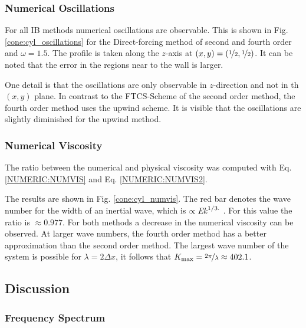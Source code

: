 \subsubsection{Numerical Oscillations}

For all IB methods numerical oscillations are observable.
This is shown in Fig. \ref{cone:cyl_oscillations} for the Direct-forcing method of second and fourth order and $\omega=1.5$.
The profile is taken along the $z$-axis at $(x,y)=(\nicefrac{1}{2},\nicefrac{1}{2})$.
It can be noted that the error  in the regions near to the wall is larger.

One detail is that the oscillations are only observable in $z$-direction and not
in th $(x,y)$ plane.
In contrast to the FTCS-Scheme of the second order method, the fourth order method uses the upwind scheme.
It is visible that the oscillations are slightly diminished for the upwind method.

\subsubsection{Numerical Viscosity}

The ratio between the numerical and physical viscosity was computed with Eq. \ref{NUMERIC:NUMVIS} and Eq. \ref{NUMERIC:NUMVIS2}.

The results are shown in Fig. \ref{cone:cyl_numvis}.
The red bar denotes the wave number for the width of an inertial wave, which is $\propto \mbox{\textit{Ek}}^{1/3.}$ \citep{Tilgner2000}.
For this value the ratio is $\approx{0.977}$.
For both methods a decrease in the numerical viscosity can  be observed.
At larger wave numbers, the fourth order method has a better approximation than the second order method.
The largest wave number of the  system is possible for $\lambda = 2\Delta x$,
it follows that $K_{\text{max}} = \nicefrac{2\pi}{\lambda} \approx 402.1$.

\subsection{Discussion}

\subsubsection{Frequency Spectrum}

